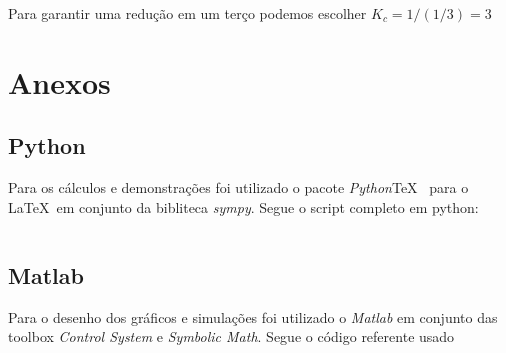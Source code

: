 \documentclass[a4paper,11pt]{article}
\begin{document}
Para garantir uma redução em um terço podemos escolher $K_c = 1/(1/3) = 3$




\nocite{sympy}
\nocite{pythontex}
\nocite{matlabcontrol}
\nocite{matlabsymbolic}

\newpage
\section*{Anexos}
\subsection*{Python}

Para os cálculos e demonstrações foi utilizado o pacote \textit{Python}\TeX\ \cite{pythontex} para o \LaTeX\ em conjunto da bibliteca \textit{sympy}\cite{sympy}. Segue o script completo em python:

\inputminted[xleftmargin=15pt,linenos,frame=single,framesep=5pt,breaklines=true]{python}{../python/exsim3.py}

\newpage
\subsection*{Matlab}

Para o desenho dos gráficos e simulações foi utilizado o \textit{Matlab} em conjunto das toolbox \textit{Control System}\cite{matlabcontrol} e \textit{Symbolic Math}\cite{matlabsymbolic}. Segue o código referente usado

\inputminted[xleftmargin=15pt,linenos,frame=single,framesep=5pt,breaklines=true]{matlab}{../matlab/exsim3.m}




\end{document}

